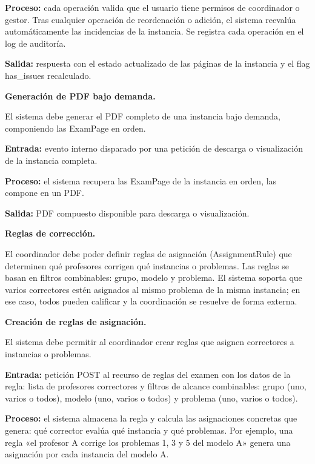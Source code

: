 \begin{functional}
\begin{functional}
    \textbf{Proceso:} cada operación valida que el usuario tiene permisos de coordinador o gestor. Tras cualquier operación de reordenación o adición, el sistema reevalúa automáticamente las incidencias de la instancia. Se registra cada operación en el log de auditoría.

    \textbf{Salida:} respuesta con el estado actualizado de las páginas de la instancia y el flag has\_issues recalculado.

    \item \textbf{Generación de PDF bajo demanda.}

    El sistema debe generar el PDF completo de una instancia bajo demanda, componiendo las ExamPage en orden.

    \textbf{Entrada:} evento interno disparado por una petición de descarga o visualización de la instancia completa.

    \textbf{Proceso:} el sistema recupera las ExamPage de la instancia en orden, las compone en un PDF.

    \textbf{Salida:} PDF compuesto disponible para descarga o visualización.

  \end{functional}

  \item \textbf{Reglas de corrección.}

  El coordinador debe poder definir reglas de asignación (AssignmentRule) que determinen qué profesores corrigen qué instancias o problemas. Las reglas se basan en filtros combinables: grupo, modelo y problema. El sistema soporta que varios correctores estén asignados al mismo problema de la misma instancia; en ese caso, todos pueden calificar y la coordinación se resuelve de forma externa.

  \begin{functional}
    \item \textbf{Creación de reglas de asignación.}

    El sistema debe permitir al coordinador crear reglas que asignen correctores a instancias o problemas.

    \textbf{Entrada:} petición POST al recurso de reglas del examen con los datos de la regla: lista de profesores correctores y filtros de alcance combinables: grupo (uno, varios o todos), modelo (uno, varios o todos) y problema (uno, varios o todos).

    \textbf{Proceso:} el sistema almacena la regla y calcula las asignaciones concretas que genera: qué corrector evalúa qué instancia y qué problemas. Por ejemplo, una regla «el profesor A corrige los problemas 1, 3 y 5 del modelo A» genera una asignación por cada instancia del modelo A.


\end{functional}
\end{functional}
